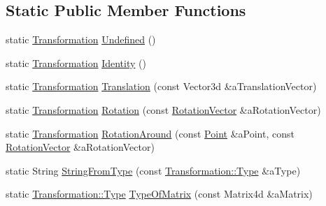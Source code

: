 \subsection*{Static Public Member Functions}
\begin{DoxyCompactItemize}
\item 
static \hyperlink{classlibrary_1_1math_1_1geom_1_1d3_1_1_transformation}{Transformation} \hyperlink{classlibrary_1_1math_1_1geom_1_1d3_1_1_transformation_acb7375bde02ed5832d5937908bee7043}{Undefined} ()
\item 
static \hyperlink{classlibrary_1_1math_1_1geom_1_1d3_1_1_transformation}{Transformation} \hyperlink{classlibrary_1_1math_1_1geom_1_1d3_1_1_transformation_a8d5af972dbba51f5746f2248f5164b69}{Identity} ()
\item 
static \hyperlink{classlibrary_1_1math_1_1geom_1_1d3_1_1_transformation}{Transformation} \hyperlink{classlibrary_1_1math_1_1geom_1_1d3_1_1_transformation_a5f781ba4e25ce79a02afccbe94a1ab0a}{Translation} (const Vector3d \&a\+Translation\+Vector)
\item 
static \hyperlink{classlibrary_1_1math_1_1geom_1_1d3_1_1_transformation}{Transformation} \hyperlink{classlibrary_1_1math_1_1geom_1_1d3_1_1_transformation_a79978a6efb749a2e058aa0b2cea092b2}{Rotation} (const \hyperlink{classlibrary_1_1math_1_1geom_1_1trf_1_1rot_1_1_rotation_vector}{Rotation\+Vector} \&a\+Rotation\+Vector)
\item 
static \hyperlink{classlibrary_1_1math_1_1geom_1_1d3_1_1_transformation}{Transformation} \hyperlink{classlibrary_1_1math_1_1geom_1_1d3_1_1_transformation_a11d93f665adb24cc4fdf2244c8509082}{Rotation\+Around} (const \hyperlink{classlibrary_1_1math_1_1geom_1_1d3_1_1objects_1_1_point}{Point} \&a\+Point, const \hyperlink{classlibrary_1_1math_1_1geom_1_1trf_1_1rot_1_1_rotation_vector}{Rotation\+Vector} \&a\+Rotation\+Vector)
\item 
static String \hyperlink{classlibrary_1_1math_1_1geom_1_1d3_1_1_transformation_a9511c7844b5b8af0c8c7ad97454a5a96}{String\+From\+Type} (const \hyperlink{classlibrary_1_1math_1_1geom_1_1d3_1_1_transformation_a25f1dc99d391174bf82a7132d08b2fc1}{Transformation\+::\+Type} \&a\+Type)
\item 
static \hyperlink{classlibrary_1_1math_1_1geom_1_1d3_1_1_transformation_a25f1dc99d391174bf82a7132d08b2fc1}{Transformation\+::\+Type} \hyperlink{classlibrary_1_1math_1_1geom_1_1d3_1_1_transformation_aa532f2c9f56ee5aff63417283a930584}{Type\+Of\+Matrix} (const Matrix4d \&a\+Matrix)
\end{DoxyCompactItemize}
